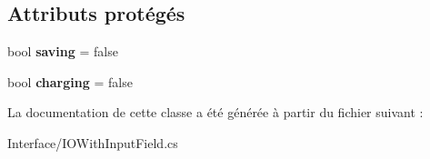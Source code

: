 \subsection*{Attributs protégés}
\begin{DoxyCompactItemize}
\item 
\mbox{\label{class_i_o_with_input_field_aa82e8c4a2116fd415d1970986860a3b9}} 
bool {\bfseries saving} = false
\item 
\mbox{\label{class_i_o_with_input_field_a8a4cc7df44ff2a3aae9683e718e6edc6}} 
bool {\bfseries charging} = false
\end{DoxyCompactItemize}


La documentation de cette classe a été générée à partir du fichier suivant \+:\begin{DoxyCompactItemize}
\item 
Interface/I\+O\+With\+Input\+Field.\+cs\end{DoxyCompactItemize}

